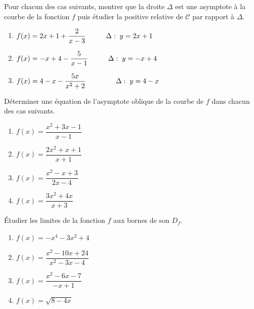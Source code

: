 \begin{exercice}
Pour chacun des cas suivants, montrer que la droite  $ \Delta $ est une asymptote à la courbe  de la  fonction $ f $ puis 
 étudier la positive relative de $ \mathcal{C} $ par rapport à $ \Delta $. 
\begin{enumerate}
\item $f(x)= 2x+1+\dfrac{2}{x-3}\hspace*{1cm}   \Delta :\; y=2x+1$

\item  $f(x)= -x+4-\dfrac{5}{x-1}\hspace*{1cm}   \Delta :\; y=-x+4$

\item $f(x)= 4-x-\dfrac{5x}{x^2+2}\hspace*{1.5cm}   \Delta :\; y=4-x$
\end{enumerate}
\end{exercice}
\begin{exercice}
Déterminer une équation de  l'asymptote oblique de la courbe de $ f $ dans chacun des cas suivants. 

\begin{enumerate}
\item $f(x)= \dfrac{x^2+3x-1}{x-1}$
\item $f(x)=\dfrac{2x^2+x+1}{x+1}$

\item $f(x)= \dfrac{x^2-x+3}{2x-4}$
\item $f(x)= \dfrac{3x^2+4x}{x+3}$
\end{enumerate}
\end{exercice}
\begin{exercice}
Étudier les limites de la fonction $ f $  aux bornes de son  $ D_f $.

\begin{enumerate}
\item $f(x)= -x^4-3x^2+4$
\item $f(x)= \dfrac{x^2-10x+24}{x^2-3x-4}$

\item $f(x)= \dfrac{x^2-6x-7}{-x+1}$
\item $f(x)=\sqrt{8-4x}$
\end{enumerate}
\end{exercice}




